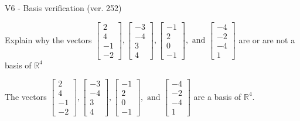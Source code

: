 \begin{exercise}
  \begin{exerciseTitle}V6 - Basis verification (ver. 252)\end{exerciseTitle}
  \begin{exerciseStatement}
    Explain why the vectors \(\left[\begin{array}{r}
2 \\
4 \\
-1 \\
-2
\end{array}\right] , \left[\begin{array}{r}
-3 \\
-4 \\
3 \\
4
\end{array}\right] , \left[\begin{array}{r}
-1 \\
2 \\
0 \\
-1
\end{array}\right] , \text{ and } \left[\begin{array}{r}
-4 \\
-2 \\
-4 \\
1
\end{array}\right]\) are or are not a basis of \(\mathbb{R}^4\)	


  \end{exerciseStatement}
  \begin{exerciseAnswer}
   The vectors \(\left[\begin{array}{r}
2 \\
4 \\
-1 \\
-2
\end{array}\right] , \left[\begin{array}{r}
-3 \\
-4 \\
3 \\
4
\end{array}\right] , \left[\begin{array}{r}
-1 \\
2 \\
0 \\
-1
\end{array}\right] , \text{ and } \left[\begin{array}{r}
-4 \\
-2 \\
-4 \\
1
\end{array}\right]\) 
  	 are  a basis of \(\mathbb{R}^4\).
  


  \end{exerciseAnswer}
\end{exercise}